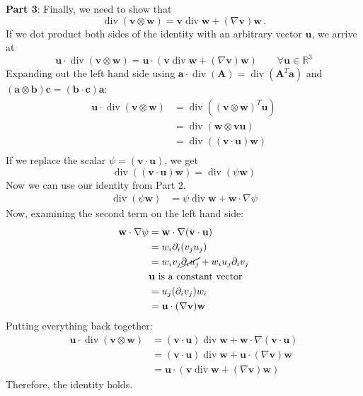\documentclass[letterpaper,10pt]{article}
\begin{document}
\textbf{Part 3}:\newline
Finally, we need to show that
\[
\operatorname{div}(\mathbf{v}\otimes\mathbf{w})
=\mathbf{v}\operatorname{div}\mathbf{w}+(\nabla\mathbf{v})\mathbf{w}\,.
\]
If we dot product both sides of the identity with an arbitrary vector
$\mathbf{u}$, we arrive at
\[
\mathbf{u}\cdot\operatorname{div}(\mathbf{v}\otimes\mathbf{w})
=\mathbf{u}\cdot\left(\mathbf{v}\operatorname{div}\mathbf{w}+(\nabla\mathbf{v}
)\mathbf{w}\right) \qquad \forall\mathbf{u}\in\mathbb{R}^3
\]
Expanding out the left hand side using
$\mathbf{a}\cdot\operatorname{div}(\mathbf{A})=\operatorname{div}(\mathbf{A}
^T\mathbf{a})$ and
$(\mathbf{a}\otimes\mathbf{b})\mathbf{c}=(\mathbf{b}\cdot\mathbf{c})\mathbf{a}$:
\begin{align*}
\mathbf{u}\cdot\operatorname{div}(\mathbf{v}\otimes\mathbf{w})
&=\operatorname{div}((\mathbf{v}\otimes\mathbf{w})^T\mathbf{u})\\
&=\operatorname{div}(\mathbf{w}\otimes\mathbf{v}\mathbf{u})\\
&=\operatorname{div}((\mathbf{v}\cdot\mathbf{u})\mathbf{w})\\
\end{align*}
If we replace the scalar $\psi=(\mathbf{v}\cdot\mathbf{u})$, we get
\[
\operatorname{div}((\mathbf{v}\cdot\mathbf{u})\mathbf{w})=\operatorname{div}
(\psi\mathbf{w})
\]
Now we can use our identity from Part 2.
\begin{align*}
\operatorname{div}(\psi\mathbf{w})
&=\psi\operatorname{div}\mathbf{w}+\mathbf{w}\cdot\nabla\psi
\end{align*}
Now, examining the second term on the left hand side:
\begin{align*}
\mathbf{w}\cdot\nabla\psi
&=\mathbf{w}\cdot\nabla(\mathbf{v}\cdot\mathbf{u})\\
&=w_i\partial_i(v_j u_j)\\
&=w_i v_j\cancel{\partial_i u_j} + w_i u_j\partial_i v_j\\
&\mathbf{u}\text{ is a constant vector}\\
&=u_j(\partial_i v_j)w_i\\
&=\mathbf{u}\cdot(\nabla\mathbf{v})\mathbf{w}
\end{align*}
Putting everything back together:
\begin{align*}
\mathbf{u}\cdot\operatorname{div}(\mathbf{v}\otimes\mathbf{w})
&=(\mathbf{v}\cdot\mathbf{u})\operatorname{div}\mathbf{w}+\mathbf{w}
\cdot\nabla(\mathbf{v}\cdot\mathbf{u})\\
&=(\mathbf{v}\cdot\mathbf{u})\operatorname{div}\mathbf{w}+\mathbf{u}
\cdot(\nabla\mathbf{v})\mathbf{w}\\
&=\mathbf{u}\cdot\left(\mathbf{v}\operatorname{div}\mathbf{w}
+(\nabla\mathbf{v})\mathbf{w}\right)
\end{align*}
Therefore, the identity holds.
\end{document}
